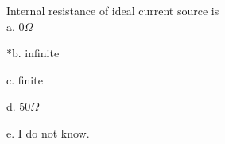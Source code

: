 
Internal resistance of ideal current source is\\

a. \( 0 \Omega \)

*b. infinite

c. finite

d. \( 50 \Omega \)

e. I do not know.\\
